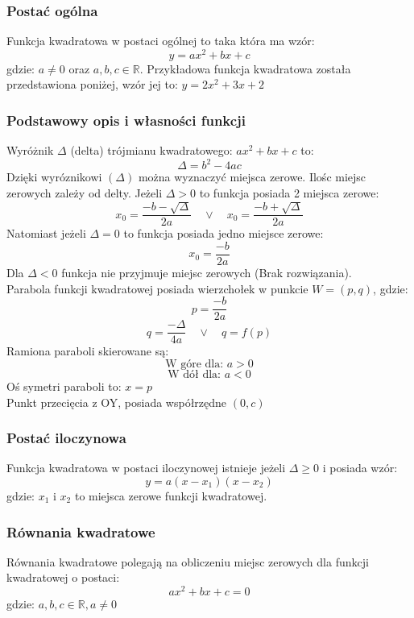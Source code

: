 \documentclass[12pt, a4paper]{article}
\begin{document}
\subsubsection*{Postać ogólna}
Funkcja kwadratowa w postaci ogólnej to taka która ma wzór:
$$y = ax^2 + bx + c$$
gdzie: $a \neq 0$ oraz $a, b, c \in \mathbb{R}$. Przykładowa funkcja kwadratowa została przedstawiona
poniżej, wzór jej to: $y = 2x^2 + 3x + 2$
\begin{center}
\end{center}
\subsubsection*{Podstawowy opis i własności funkcji}
Wyróżnik $\Delta$ (delta) trójmianu kwadratowego: $ax^2 + bx + c$ to:
$$\Delta = b^2 - 4ac$$
Dzięki wyróznikowi $(\Delta)$ można wyznaczyć miejsca zerowe. Ilośc miejsc zerowych zależy od delty.
Jeżeli $\Delta > 0$ to funkcja posiada 2 miejsca zerowe:
$$x_0 = \frac{-b - \sqrt{\Delta}}{2a}\quad\vee\quad x_0=\frac{-b + \sqrt{\Delta}}{2a}$$
Natomiast jeżeli $\Delta = 0$ to funkcja posiada jedno miejsce zerowe:
$$x_0 = \frac{-b}{2a}$$
Dla $\Delta < 0$ funkcja nie przyjmuje miejsc zerowych (Brak rozwiązania). \\
Parabola funkcji kwadratowej posiada wierzchołek w punkcie $W=(p, q)$, gdzie:
$$p = \frac{-b}{2a}$$
$$q = \frac{-\Delta}{4a}\quad\vee\quad q = f(p)$$
Ramiona paraboli skierowane są:
$$\text{W góre dla: } a > 0$$
$$\text{W dół dla: } a < 0$$
Oś symetri paraboli to: $x = p$ \\
Punkt przecięcia z OY, posiada współrzędne $\left(0, c\right)$
\subsubsection*{Postać iloczynowa}
Funkcja kwadratowa w postaci iloczynowej istnieje jeżeli $\Delta \geq 0$ i posiada wzór:
$$y = a\left(x - x_1\right)\left(x - x_2\right)$$
gdzie: $x_1$ i $x_2$ to miejsca zerowe funkcji kwadratowej.

\subsubsection*{Równania kwadratowe}
Równania kwadratowe polegają na obliczeniu miejsc zerowych dla funkcji kwadratowej o postaci:
$$ax^2 + bx + c = 0 $$
gdzie: $a, b, c \in \mathbb{R}, a \neq 0$ \\
\vspace{0em}
\end{document}
